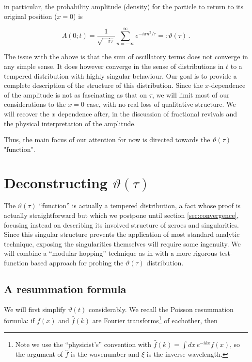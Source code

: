 \documentclass{article}
\newcommand{\T}{\ensuremath{\vartheta}}
\newcommand{\sumZ}{\sum_{n=-\infty}^{\infty}}
\begin{document}
in particular, the probability amplitude (density) for the particle to return to its original position ($x=0$) is

\begin{equation}
    A(0;t) = \frac{1}{\sqrt{-i\tau}} \sumZ e^{-{i \pi n^2}/{\tau}} =: \T(\tau)\,.
\end{equation}


The issue with the above is that the sum of oscillatory terms does not converge in any simple sense. It does however converge in the sense of distributions in $t$ to a tempered distribution with highly singular behaviour. Our goal is to provide a complete description of the structure of this distribution. Since the $x$-dependence of the amplitude is not as fascinating as that on $\tau$, we will limit most of our considerations to the $x=0$ case, with no real loss of qualitative structure. We will recover the $x$ dependence after, in the discussion of fractional revivals and the physical interpretation of the amplitude.

Thus, the main focus of our attention for now is directed towards the $\T(\tau)$ "function".


\section{Deconstructing $\T(\tau)$}

The $\T(\tau)$ ``function'' is actually a tempered distribution, a fact whose proof is actually straightforward but which we postpone until section \ref{sec:convergence}, focusing instead on describing its involved structure of zeroes and singularities. Since this singular structure prevents the application of most standard analytic technique, exposing the singularities themselves will require some ingenuity. We will combine a ``modular hopping'' technique as in \cite{boxpdf} with a more rigorous test-function based approach for probing the $\T(\tau)$ distribution.

\subsection{A resummation formula}\label{resummation}

We will first simplify $\T(t)$ considerably. We recall the Poisson resummation formula\cite{bellman}: if $f(x)$ and $\hat f(k)$ are Fourier transforms\footnote{Note we use the ``physicist's'' convention with $\hat f(k) = \int dx\, e^{-ikx} f(x)$, so the argument of $\hat f$ is the wavenumber and $\xi$ is the inverse wavelength.} of eachother, then
\end{document}
